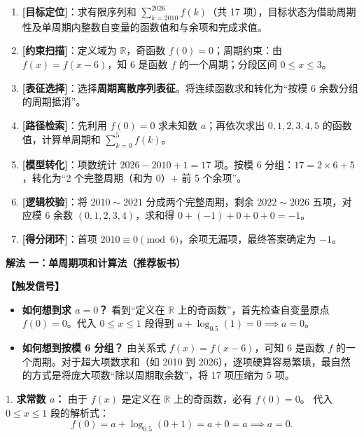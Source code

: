 \documentclass[11pt,a4paper,fontset=fandol]{ctexart}
\newcommand{\method}[1]{\par\medskip\noindent\textbf{解法 #1}\par}
\begin{document}
\medskip
\begin{tcolorbox}[colback=gray!4,colframe=ink!70,boxrule=0.7pt,arc=1mm,before skip=6pt,after skip=6pt,top=4pt,bottom=4pt,title=\textbf{决策路线}]
\begin{enumerate}[label=\textbf{\arabic*\ },leftmargin=1.8em]
  \item \textbf{[目标定位]}：求有限序列和 \(\sum_{k=2010}^{2026} f(k)\)（共 17 项），目标状态为借助周期性及单周期内整数自变量的函数值和与余项和完成求值。
  \item \textbf{[约束扫描]}：定义域为 \(\mathbb{R}\)，奇函数 \(f(0)=0\)；周期约束：由 \(f(x)=f(x-6)\)，知 6 是函数 \(f\) 的一个周期；分段区间 \(0 \le x \le 3\)。
  \item \textbf{[表征选择]}：选择\textbf{周期离散序列表征}。将连续函数求和转化为“按模 6 余数分组的周期抵消”。
  \item \textbf{[路径检索]}：先利用 \(f(0)=0\) 求未知数 \(a\)；再依次求出 \(0,1,2,3,4,5\) 的函数值，计算单周期和 \(\sum_{k=0}^{5} f(k)\)。
  \item \textbf{[模型转化]}：项数统计 \(2026 - 2010 + 1 = 17\) 项。按模 6 分组：\(17 = 2 \times 6 + 5\)，转化为“2 个完整周期（和为 0）+ 前 5 个余项”。
  \item \textbf{[逻辑校验]}：将 \(2010 \sim 2021\) 分成两个完整周期，剩余 \(2022 \sim 2026\) 五项，对应模 6 余数 \((0,1,2,3,4)\)，求和得 \(0 + (-1) + 0 + 0 + 0 = -1\)。
  \item \textbf{[得分闭环]}：首项 \(2010 \equiv 0 \pmod 6\)，余项无漏项，最终答案确定为 \(-1\)。
\end{enumerate}
\end{tcolorbox}

\method{一：单周期项和计算法（推荐板书）}

\noindent\textbf{【触发信号】}
\begin{itemize}[leftmargin=1.5em]
  \item \textbf{如何想到求 $a=0$？} 看到“定义在 \(\mathbb{R}\) 上的奇函数”，首先检查自变量原点 \(f(0)=0\)。代入 \(0 \le x \le 1\) 段得到 \(a + \log_{0.5}(1) = 0 \implies a=0\)。
  \item \textbf{如何想到按模 6 分组？} 由关系式 \(f(x) = f(x-6)\)，可知 6 是函数 \(f\) 的一个周期。对于超大项数求和（如 2010 到 2026），逐项硬算容易繁琐，最自然的方式是将庞大项数“除以周期取余数”，将 17 项压缩为 5 项。
\end{itemize}

1. \textbf{求常数 $a$：}
由于 $f(x)$ 是定义在 $\mathbb{R}$ 上的奇函数，必有 $f(0) = 0$。
代入 $0 \le x \le 1$ 段的解析式：
\[
f(0) = a + \log_{0.5}(0 + 1) = a + 0 = a \implies a = 0.
\]
\end{document}
